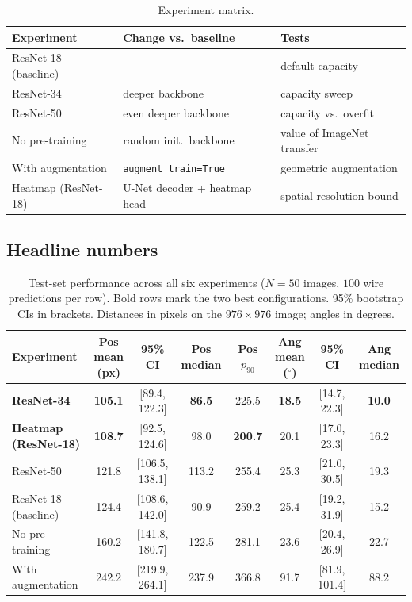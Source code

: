 \documentclass[conference,10pt,letterpaper]{IEEEtran}
\newcommand{\rnt}{ResNet-34}
\newcommand{\rne}{ResNet-18}
\begin{document}
\begin{table}[t]
\caption{Experiment matrix.}
\label{tab:experiments}
\centering
\renewcommand{\arraystretch}{1.15}
\footnotesize
\begin{tabular}{p{} p{} p{}}
\toprule
\textbf{Experiment} & \textbf{Change vs.\ baseline} & \textbf{Tests}\\
\midrule
\rne{} (baseline) & ---
   & default capacity\\
\rnt{}            & deeper backbone
   & capacity sweep\\
ResNet-50         & even deeper backbone
   & capacity vs.\ overfit\\
No pre-training   & random init.\ backbone
   & value of ImageNet transfer\\
With augmentation & \texttt{augment\_train{=}True}
   & geometric augmentation\\
Heatmap (\rne)    & U-Net decoder + heatmap head
   & spatial-resolution bound\\
\bottomrule
\end{tabular}
\end{table}

\subsection{Headline numbers}
\label{sec:quant}

\begin{table}[t]
\caption{Test-set performance across all six experiments ($N{=}50$
images, $100$ wire predictions per row). Bold rows mark the two best
configurations. 95\% bootstrap CIs in brackets. Distances in pixels on
the $976{\times}976$ image; angles in degrees.}
\label{tab:results}
\centering
\renewcommand{\arraystretch}{1.20}
\small
\begin{tabular}{l c c c c c c c}
\toprule
\textbf{Experiment} &
\textbf{Pos mean (px)} & \textbf{95\% CI} &
\textbf{Pos median} & \textbf{Pos $p_{90}$} &
\textbf{Ang mean ($^\circ$)} & \textbf{95\% CI} &
\textbf{Ang median}\\
\midrule
\textbf{\rnt{}}              & \textbf{105.1} & [89.4, 122.3] & \textbf{86.5}  & 225.5 & \textbf{18.5} & [14.7, 22.3] & \textbf{10.0}\\
\textbf{Heatmap (\rne)}      & \textbf{108.7} & [92.5, 124.6] & 98.0           & \textbf{200.7} & 20.1 & [17.0, 23.3] & 16.2\\
ResNet-50                    & 121.8 & [106.5, 138.1] & 113.2 & 255.4 & 25.3 & [21.0, 30.5] & 19.3\\
\rne{} (baseline)            & 124.4 & [108.6, 142.0] & 90.9  & 259.2 & 25.4 & [19.2, 31.9] & 15.2\\
No pre-training              & 160.2 & [141.8, 180.7] & 122.5 & 281.1 & 23.6 & [20.4, 26.9] & 22.7\\
With augmentation            & 242.2 & [219.9, 264.1] & 237.9 & 366.8 & 91.7 & [81.9, 101.4] & 88.2\\
\bottomrule
\end{tabular}
\end{table}
\end{document}
